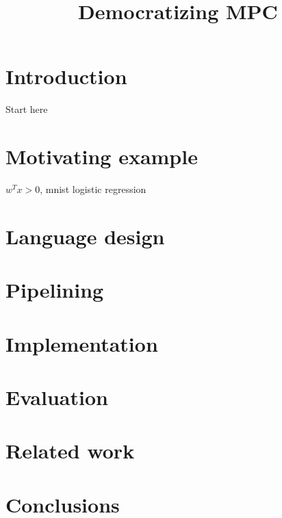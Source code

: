 \documentclass[conference,compsoc]{IEEEtran}
\begin{document}
\title{Democratizing MPC}





\maketitle
\IEEEpeerreviewmaketitle


\graphicspath{{./Images/}}

\section{Introduction}
\label{sec:intro}
Start here~\cite{lambdaps,wysteria}
\section{Motivating example}
\label{sec:ex}
$w^Tx>0$, mnist logistic regression
\section{Language design}
\label{sec:l}
\section{Pipelining}
\label{sec:pipe}
\section{Implementation}
\label{sec:impl}
\section{Evaluation}
\label{sec:eval}

\section{Related work}
\label{sec:related}
\section{Conclusions}
\label{sec:concl}
\newpage


\balance
\end{document}
